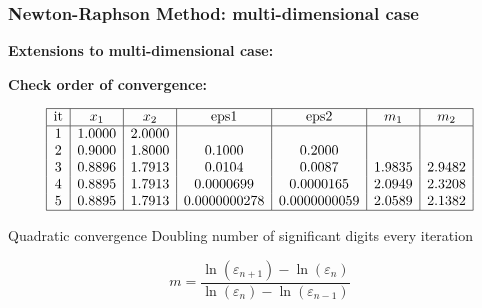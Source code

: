   \begin{frame}[fragile]
    \frametitle{Newton-Raphson Method: multi-dimensional case}
  
    \textbf{Extensions to multi-dimensional case:}
  
    \textbf{Check order of convergence:}
  
    \[
    \begin{array}{|c|c|c|c|c|c|c|}
    \hline
    \text{it} & x_1 & x_2 & \text{eps1} & \text{eps2} & m_1 & m_2 \\
    \hline
    1 & 1.0000 & 2.0000 & & & & \\
    2 & 0.9000 & 1.8000 & 0.1000 & 0.2000 & & \\
    3 & 0.8896 & 1.7913 & 0.0104 & 0.0087 & 1.9835 & 2.9482 \\
    4 & 0.8895 & 1.7913 & 0.0000699 & 0.0000165 & 2.0949 & 2.3208 \\
    5 & 0.8895 & 1.7913 & 0.0000000278 & 0.0000000059 & 2.0589 & 2.1382 \\
    \hline
    \end{array}
    \]
    
    \begin{block}{Quadratic convergence}
    Doubling number of significant digits every iteration
    \end{block}
    \[
    m = \frac{\ln(\varepsilon_{n+1}) - \ln(\varepsilon_n)}{\ln(\varepsilon_n) - \ln(\varepsilon_{n-1})}
    \]
  \end{frame}

